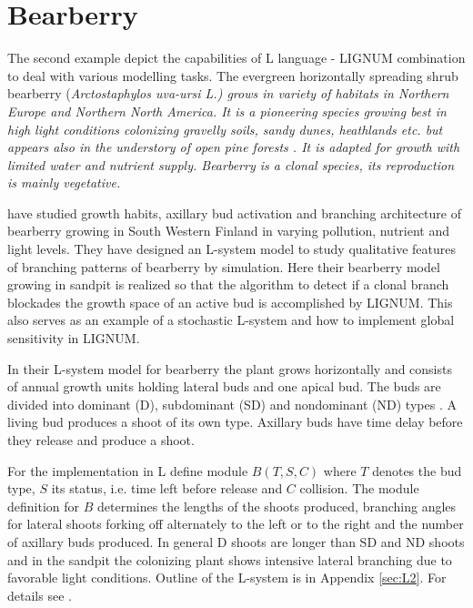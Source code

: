 \section{Bearberry}\label{sec:bearberry}

The  second example  depict the  capabilities of  L language  - LIGNUM
combination  to  deal with  various  modelling  tasks.  The  evergreen
horizontally  spreading shrub  bearberry (\it  Arctostaphylos uva-ursi
\rm L.)  grows in variety  of habitats in Northern Europe and Northern
North America.  It is a  pioneering species growing best in high light
conditions  colonizing gravelly  soils, sandy  dunes,  heathlands etc.
but   appears  also   in   the  understory   of   open  pine   forests
\citep{salemaa:99}.  It  is adapted for growth with  limited water and
nutrient supply.   Bearberry is a clonal species,  its reproduction is
mainly vegetative.

\citet{salemaa:02} have studied growth habits, axillary bud activation
and  branching  architecture of  bearberry  growing  in South  Western
Finland in  varying pollution, nutrient  and light levels.   They have
designed an L-system model  to study qualitative features of branching
patterns  of  bearberry by  simulation.   Here  their bearberry  model
growing in  sandpit is realized so  that the algorithm to  detect if a
clonal  branch  blockades  the  growth  space  of  an  active  bud  is
accomplished by LIGNUM. This also serves as an example of a stochastic
L-system  \citep{pp:90}  and   how  to  implement  global  sensitivity
\citep{kurth:94} in LIGNUM.

In  their L-system  model for  bearberry \citep{salemaa:02}  the plant
grows horizontally and consists of annual growth units holding lateral
buds  and one apical  bud.  The  buds are  divided into  dominant (D),
subdominant  (SD) and nondominant  (ND) types  \citep{remphrey:83}.  A
living bud produces a shoot of  its own type.  Axillary buds have time
delay before they release and produce a shoot.

For the implementation in L define module $B(T,S,C)$ where $T$ denotes
the bud type,  $S$ its status, i.e.  time left  before release and $C$
collision.  The  module definition for  $B$ determines the  lengths of
the shoots  produced, branching angles for lateral  shoots forking off
alternately to  the left or  to the right  and the number  of axillary
buds produced.  In  general D shoots are longer than  SD and ND shoots
and  in  the sandpit  the  colonizing  plant  shows intensive  lateral
branching due to favorable  light conditions.  Outline of the L-system
is in Appendix \ref{sec:L2}.  For details see \citet{salemaa:02}.

